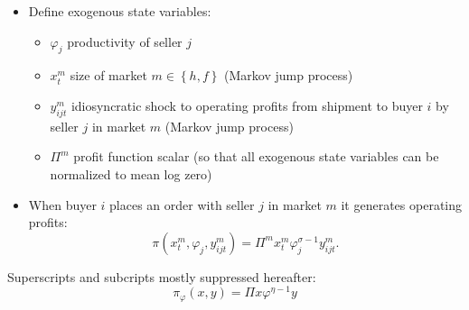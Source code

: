 \documentclass[notes=show]{beamer}
\begin{document}
\begin{frame}%



\begin{itemize}
\item Define exogenous state variables:

\begin{itemize}
\item $\varphi _{j}$ productivity of seller $j$

\item $x_{t}^{m}$ size of market $m\in \left\{ h,f\right\} $ (Markov jump
process)

\item $y_{ijt}^{m}$ idiosyncratic shock to operating profits from shipment
to buyer $i$ by seller $j$ in market $m$ (Markov jump process)

\item $\Pi ^{m}$ profit function scalar (so that all exogenous state
variables can be normalized to mean log zero)
\end{itemize}

\item When buyer $i$ places an order with seller $j$ in market $m$ it
generates operating profits:%
\[
\pi (x_{t}^{m},\varphi _{j},y_{ijt}^{m})=\Pi ^{m}x_{t}^{m}\varphi
_{j}^{\sigma -1}y_{ijt}^{m}. 
\]
\end{itemize}

Superscripts and subcripts mostly suppressed hereafter:%
\[
\pi _{\varphi }(x,y)=\Pi x\varphi ^{\eta -1}y 
\]

\end{frame}%
\end{document}

